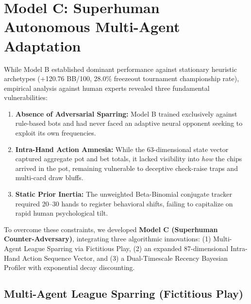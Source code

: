 
\section{Model C: Superhuman Autonomous Multi-Agent Adaptation}
\label{sec:model_c}

While Model B established dominant performance against stationary heuristic archetypes (+120.76 BB/100, 28.0\% freezeout tournament championship rate), empirical analysis against human experts revealed three fundamental vulnerabilities:
\begin{enumerate}
    \item \textbf{Absence of Adversarial Sparring:} Model B trained exclusively against rule-based bots and had never faced an adaptive neural opponent seeking to exploit its own frequencies.
    \item \textbf{Intra-Hand Action Amnesia:} While the 63-dimensional state vector captured aggregate pot and bet totals, it lacked visibility into \textit{how} the chips arrived in the pot, remaining vulnerable to deceptive check-raise traps and multi-card draw bluffs.
    \item \textbf{Static Prior Inertia:} The unweighted Beta-Binomial conjugate tracker required 20--30 hands to register behavioral shifts, failing to capitalize on rapid human psychological tilt.
\end{enumerate}

To overcome these constraints, we developed \textbf{Model C (Superhuman Counter-Adversary)}, integrating three algorithmic innovations: (1) Multi-Agent League Sparring via Fictitious Play, (2) an expanded 87-dimensional Intra-Hand Action Sequence Vector, and (3) a Dual-Timescale Recency Bayesian Profiler with exponential decay discounting.

\subsection{Multi-Agent League Sparring (Fictitious Play)}
\label{subsec:league}

